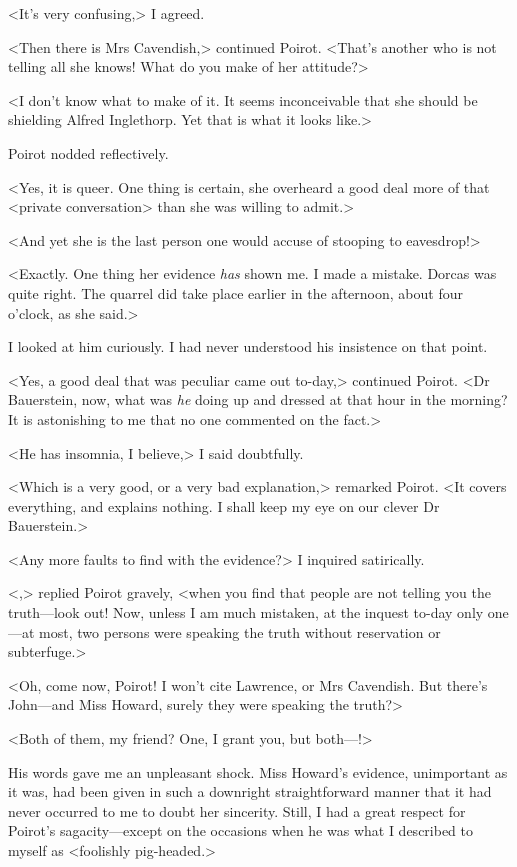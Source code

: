  <It's very confusing,> I agreed. 

 <Then there is Mrs Cavendish,> continued Poirot. <That's another who is not telling all she knows! What do you make of her attitude?> 

 <I don't know what to make of it. It seems inconceivable that she should be shielding Alfred Inglethorp. Yet that is what it looks like.> 

 Poirot nodded reflectively. 

 <Yes, it is queer. One thing is certain, she overheard a good deal more of that <private conversation> than she was willing to admit.> 

 <And yet she is the last person one would accuse of stooping to eavesdrop!> 

 <Exactly. One thing her evidence \emph{has} shown me. I made a mistake. Dorcas was quite right. The quarrel did take place earlier in the afternoon, about four o'clock, as she said.> 

 I looked at him curiously. I had never understood his insistence on that point. 

 <Yes, a good deal that was peculiar came out to-day,> continued Poirot. <Dr Bauerstein, now, what was \emph{he} doing up and dressed at that hour in the morning? It is astonishing to me that no one commented on the fact.> 

 <He has insomnia, I believe,> I said doubtfully. 

 <Which is a very good, or a very bad explanation,> remarked Poirot. <It covers everything, and explains nothing. I shall keep my eye on our clever Dr Bauerstein.> 

 <Any more faults to find with the evidence?> I inquired satirically. 

 <,> replied Poirot gravely, <when you find that people are not telling you the truth—look out! Now, unless I am much mistaken, at the inquest to-day only one—at most, two persons were speaking the truth without reservation or subterfuge.> 

 <Oh, come now, Poirot! I won't cite Lawrence, or Mrs Cavendish. But there's John—and Miss Howard, surely they were speaking the truth?> 

 <Both of them, my friend? One, I grant you, but both—!> 

 His words gave me an unpleasant shock. Miss Howard's evidence, unimportant as it was, had been given in such a downright straightforward manner that it had never occurred to me to doubt her sincerity. Still, I had a great respect for Poirot's sagacity—except on the occasions when he was what I described to myself as <foolishly pig-headed.> 

